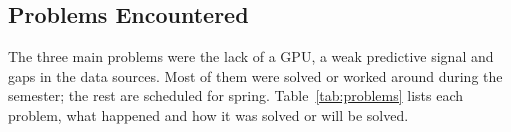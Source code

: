 %

\subsection{Problems Encountered}
\label{sec:problems}

The three main problems were the lack of a GPU, a weak predictive signal and
gaps in the data sources. Most of them were solved or worked around during the
semester; the rest are scheduled for spring. Table~\ref{tab:problems} lists each
problem, what happened and how it was solved or will be solved.

